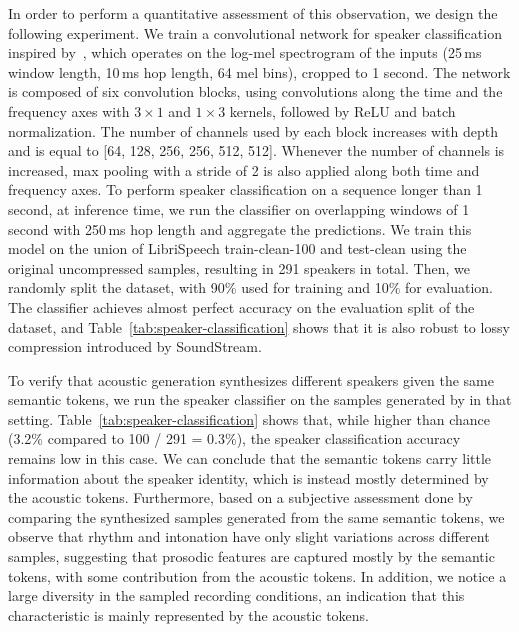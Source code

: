 \documentclass[letterpaper,10 pt]{IEEEtran}
\begin{document}
In order to perform a quantitative assessment of this observation, we design the following experiment. We train a convolutional network for speaker classification inspired by~\cite{tagliasacchi_self_supervised}, which operates on the log-mel spectrogram of the inputs (25\,ms window length, 10\,ms hop length, 64 mel bins), cropped to 1 second. The network is composed of six convolution blocks, using convolutions along the time and the frequency axes with $3\times1$ and $1\times3$ kernels, followed by ReLU and batch normalization. The number of channels used by each block increases with depth and is equal to [64, 128, 256, 256, 512, 512]. Whenever the number of channels is increased, max pooling with a stride of 2 is also applied along both time and frequency axes. To perform speaker classification on a sequence longer than 1 second, at inference time, we run the classifier on overlapping windows of 1 second with 250\,ms hop length and aggregate the predictions. We train this model on the union of LibriSpeech train-clean-100 and test-clean using the original uncompressed samples, resulting in 291 speakers in total. Then, we randomly split the dataset, with 90\% used for training and 10\% for evaluation. The classifier achieves almost perfect accuracy on the evaluation split of the dataset, and Table~\ref{tab:speaker-classification} shows that it is also robust to lossy compression introduced by SoundStream. 

To verify that acoustic generation synthesizes different speakers given the same semantic tokens, we run the speaker classifier on the samples generated by \ours{} in that setting. Table~\ref{tab:speaker-classification} shows that, while higher than chance (3.2\% compared to 100 / 291 = 0.3\%), the speaker classification accuracy remains low in this case. We can conclude that the semantic tokens carry little information about the speaker identity, which is instead mostly determined by the acoustic tokens. Furthermore, based on a subjective assessment done by comparing the synthesized samples generated from the same semantic tokens, we observe that rhythm and intonation have only slight variations across different samples, suggesting that prosodic features are captured mostly by the semantic tokens, with some contribution from the acoustic tokens. In addition, we notice a large diversity in the sampled recording conditions, an indication that this characteristic is mainly represented by the acoustic tokens.
\end{document}
